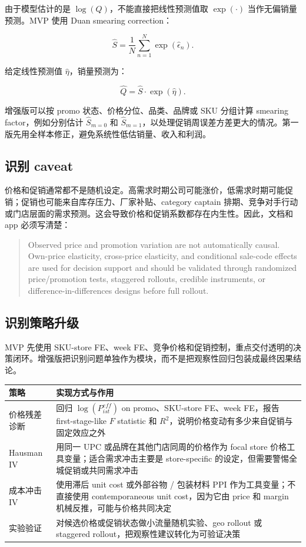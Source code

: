 \documentclass[UTF8,11pt,a4paper,fontset=none]{ctexart}
\begin{document}
由于模型估计的是 $\log(Q)$，不能直接把线性预测值取 $\exp(\cdot)$ 当作无偏销量预测。MVP 使用 Duan smearing correction：

\begin{equation}
\widehat{S}=\frac{1}{N}\sum_{n=1}^{N}\exp(\widehat{\epsilon}_n).
\end{equation}

给定线性预测值 $\widehat{\eta}$，销量预测为：

\begin{equation}
\widehat{Q}=\widehat{S}\cdot\exp(\widehat{\eta}).
\end{equation}

增强版可以按 promo 状态、价格分位、品类、品牌或 SKU 分组计算 smearing factor，例如分别估计 $\widehat{S}_{m=0}$ 和 $\widehat{S}_{m=1}$，以处理促销周误差方差更大的情况。第一版先用全样本修正，避免系统性低估销量、收入和利润。

\subsection{识别 caveat}

价格和促销通常都不是随机设定。高需求时期公司可能涨价，低需求时期可能促销；促销也可能来自库存压力、厂家补贴、category captain 排期、竞争对手行动或门店层面的需求预测。这会导致价格和促销系数都存在内生性。因此，文档和 app 必须写清楚：

\begin{quote}
Observed price and promotion variation are not automatically causal. Own-price elasticity, cross-price elasticity, and conditional sale-code effects are used for decision support and should be validated through randomized price/promotion tests, staggered rollouts, credible instruments, or difference-in-differences designs before full rollout.
\end{quote}

\subsection{识别策略升级}

MVP 先使用 SKU-store FE、week FE、竞争价格和促销控制，重点交付透明的决策闭环。增强版把识别问题单独作为模块，而不是把观察性回归包装成最终因果结论。

\begin{tabularx}{\textwidth}{L{3.5cm}Y}
\toprule
策略 & 实现方式与作用 \\
\midrule
价格残差诊断 & 回归 $\log(P^{eff}_{ist})$ on promo、SKU-store FE、week FE，报告 first-stage-like $F$ statistic 和 $R^2$，说明价格变动有多少来自促销与固定效应之外 \\
Hausman IV & 用同一 UPC 或品牌在其他门店同周的价格作为 focal store 价格工具变量；适合需求冲击主要是 store-specific 的设定，但需要警惕全城促销或共同需求冲击 \\
成本冲击 IV & 使用滞后 unit cost 或外部谷物 / 包装材料 PPI 作为工具变量；不直接使用 contemporaneous unit cost，因为它由 price 和 margin 机械反推，可能与价格共同决定 \\
实验验证 & 对候选价格或促销状态做小流量随机实验、geo rollout 或 staggered rollout，把观察性建议转化为可验证决策 \\
\bottomrule
\end{tabularx}
\end{document}
